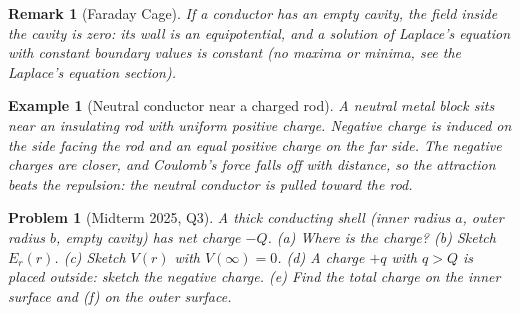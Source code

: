 \documentclass{article}
\newtheorem{problem}{Problem}
\newtheorem*{example}{Example}
\newtheorem{remark}{Remark}
\begin{document}
\begin{remark}[Faraday Cage]
    If a conductor has an empty cavity, the field inside the cavity is zero: its wall is an equipotential, and a solution of Laplace's equation with constant boundary values is constant (no maxima or minima, see the Laplace's equation section).
\end{remark}
\begin{example}[Neutral conductor near a charged rod]
    A neutral metal block sits near an insulating rod with uniform positive charge. Negative charge is induced on the side facing the rod and an equal positive charge on the far side. The negative charges are closer, and Coulomb's force falls off with distance, so the attraction beats the repulsion: the neutral conductor is pulled toward the rod.
\end{example}
\begin{problem}[Midterm 2025, Q3]
    A thick conducting shell (inner radius $a$, outer radius $b$, empty cavity) has net charge $-Q$. (a) Where is the charge? (b) Sketch $E_r(r)$. (c) Sketch $V(r)$ with $V(\infty) = 0$. (d) A charge $+q$ with $q > Q$ is placed outside: sketch the negative charge. (e) Find the total charge on the inner surface and (f) on the outer surface.
\end{problem}
\end{document}

